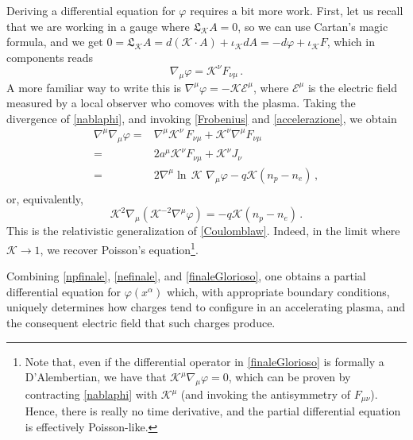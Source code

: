 \documentclass[a4paper, amsfonts, amssymb, amsmath, reprint, showkeys, nofootinbib, twoside, onecolumn,notitlepage]{revtex4-1}
\newcommand{\K}{{\mathcal{K}}}
\theoremstyle{definition}
\theoremstyle{theorem}
\begin{document}
Deriving a differential equation for $\varphi$ requires a bit more work. First, let us recall that we are working in a gauge where $\mathfrak{L}_\K A=0$, so we can use Cartan's magic formula, and we get $0=\mathfrak{L}_\K A=d(\K \cdot A)+\iota_\K dA=-d\varphi+\iota_\K F$, which in components reads
\begin{equation}\label{nablaphi}
\nabla_\mu \varphi =\K^\nu F_{\nu \mu} \, .
\end{equation}
A more familiar way to write this is $\nabla^\mu \varphi=-\K \mathcal{E}^\mu $, where $\mathcal{E}^\mu$ is the electric field measured by a local observer who comoves with the plasma. Taking the divergence of \eqref{nablaphi}, and invoking \eqref{Frobenius} and \eqref{accelerazione}, we obtain
\begin{equation}
\begin{split}
\nabla^\mu \nabla_\mu \varphi ={}& \nabla^\mu \K^\nu \, F_{\nu \mu} +\K^\nu \nabla^\mu F_{\nu \mu} \\
={}& 2a^\mu \K^\nu F_{\nu \mu} +\K^\nu J_\nu \\
={}& 2 \nabla^\mu {\ln}\, \K \, \, \nabla_\mu \varphi -q\K (n_p-n_e) \, , \\
\end{split}
\end{equation}
or, equivalently,
\begin{equation}\label{finaleGlorioso}
\boxed{ \K^2 \nabla_\mu \left( \K^{-2} \nabla^\mu \varphi\right)  = -q \K (n_p{-}n_e) \, .}
\end{equation}
This is the relativistic generalization of \eqref{Coulomblaw}. Indeed, in the limit where $\K \rightarrow 1$, we recover Poisson's equation\footnote{Note that, even if the differential operator in \eqref{finaleGlorioso} is formally a D'Alembertian, we have that $\K^\mu \nabla_\mu \varphi=0$, which can be proven by contracting \eqref{nablaphi} with $\K^\mu$ (and invoking the antisymmetry of $F_{\mu \nu}$). Hence, there is really no time derivative, and the partial differential equation is effectively Poisson-like.}.

Combining \eqref{npfinale}, \eqref{nefinale}, and \eqref{finaleGlorioso}, one obtains a partial differential equation for $\varphi(x^\alpha)$ which, with appropriate boundary conditions, uniquely determines how charges tend to configure in an accelerating plasma, and the consequent electric field that such charges produce.
\end{document}
